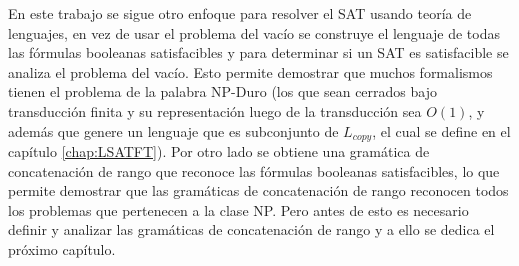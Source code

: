 \documentclass[12pt]{article}
\begin{document}
En este trabajo se sigue otro enfoque para resolver el SAT usando teoría de lenguajes, en vez de usar el problema del vacío se 
construye el lenguaje de todas las fórmulas booleanas satisfacibles y para determinar si un SAT es satisfacible 
se analiza el problema del vacío. Esto permite demostrar que muchos formalismos tienen el problema de la palabra 
NP-Duro (los que sean cerrados bajo transducción finita y su representación luego de la transducción sea $O(1)$, 
y además que genere un lenguaje que es subconjunto de $L_{copy}$, el cual se define en el capítulo 
\ref{chap:LSATFT}). Por otro lado se obtiene una gramática de concatenación de rango que reconoce las fórmulas 
booleanas satisfacibles, lo que permite demostrar que las gramáticas de concatenación de rango reconocen todos 
los problemas que pertenecen a la clase NP. Pero antes de esto es necesario definir y analizar las gramáticas 
de concatenación de rango y a ello se dedica el próximo capítulo.
\end{document}
